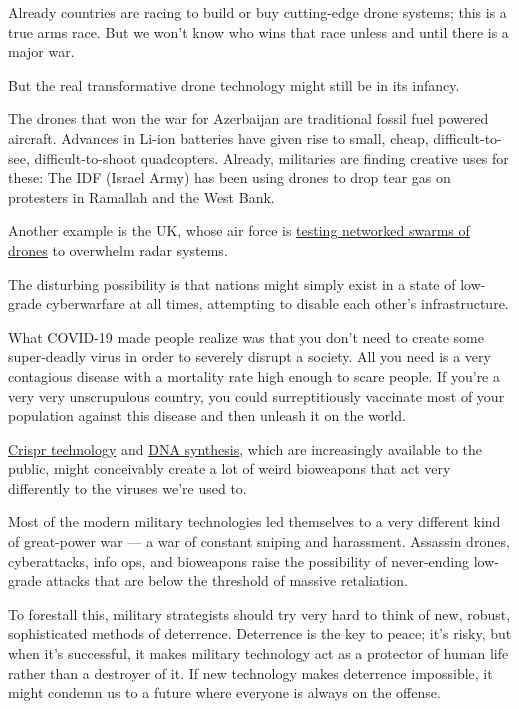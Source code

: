 \documentclass[
]{book}
\begin{document}
Already countries are racing to build or buy cutting-edge drone systems; this is a true arms race. But we won't know who wins that race unless and until there is a major war.

But the real transformative drone technology might still be in its infancy.

The drones that won the war for Azerbaijan are traditional fossil fuel powered aircraft. Advances in Li-ion batteries have given rise to small, cheap, difficult-to-see, difficult-to-shoot quadcopters. Already, militaries are finding creative uses for these: The IDF (Israel Army) has been using drones to drop tear gas on protesters in Ramallah and the West Bank.

Another example is the UK, whose air force is \href{https://www.thedrive.com/the-war-zone/36950/raf-tests-swarm-loaded-with-britecloud-electronic-warfare-decoys-to-overwhelm-air-defenses}{testing networked swarms of drones} to overwhelm radar systems.

The disturbing possibility is that nations might simply exist in a state of low-grade cyberwarfare at all times, attempting to disable each other's infrastructure.

What COVID-19 made people realize was that you don't need to create some super-deadly virus in order to severely disrupt a society. All you need is a very contagious disease with a mortality rate high enough to scare people. If you're a very very unscrupulous country, you could surreptitiously vaccinate most of your population against this disease and then unleash it on the world.

\href{https://www.americansecurityproject.org/crispr-is-making-bioweapons-more-accessible/}{Crispr technology} and \href{https://cen.acs.org/biological-chemistry/synthetic-biology/Synthetic-biology-enable-bioweapons-development/96/i26}{DNA synthesis}, which are increasingly available to the public, might conceivably create a lot of weird bioweapons that act very differently to the viruses we're used to.

Most of the modern military technologies led themselves to a very different kind of great-power war --- a war of constant sniping and harassment. Assassin drones, cyberattacks, info ops, and bioweapons raise the possibility of never-ending low-grade attacks that are below the threshold of massive retaliation.

To forestall this, military strategists should try very hard to think of new, robust, sophisticated methods of deterrence. Deterrence is the key to peace; it's risky, but when it's successful, it makes military technology act as a protector of human life rather than a destroyer of it. If new technology makes deterrence impossible, it might condemn us to a future where everyone is always on the offense.
\end{document}
